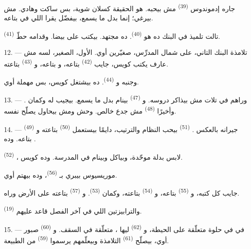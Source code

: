 جاره إدموندوس \textsuperscript{(39)} مش بيحبه. هو الحقيقة كسلان شوية، بس ساكت
وهادي. مش بيرغي؛ إنما بدل ما يسمع، بيفضّل يقرا  اللي في
 بتاعه.

تالت تلميذ في البنك ده هو  \textsuperscript{(40)}. ده مجتهد.
بيكتب على  بيضا. وقدامه حطّ 
\textsuperscript{(41)}.

12. --- تلامذة البنك التاني، على شمال المدرِّس، صغيّرين أوي. الأول،
 الصغير، لسه مش عارف يكتب كويس، جايب 
\textsuperscript{(42)} بتاعه، و بتاعه، و
\textsuperscript{(43)} بتاعته.

وجنبه  و \textsuperscript{(44)}. ده بيشتغل
كويس، بس  مهملة أوي.

13. --- وراهم في تلات  مش بيذاكر دروسه.
و \textsuperscript{(47)} بينام بدل ما يسمع.  بيجيب له
 وكمان . وأخيرًا 
\textsuperscript{(48)} مش جدع خالص.  وحش ومش بيحاول يصلّح نفسه.

14. --- جيرانه بالعكس . 
\textsuperscript{(51)} بيحب النظام والترتيب، دايمًا بيستعمل 
\textsuperscript{(50)} بتاعته و \textsuperscript{(49)} بتاعه.
وده .

 \textsuperscript{(52)} ، لابس بدلة موحّدة،
وبياكل وبينام في المدرسة. وده  كويس.

موريسيوس بيبري  بـ \textsuperscript{(56)}، وده بيهتم
أوي.

جايب كل كتبه، و \textsuperscript{(55)} بتاعه، و
\textsuperscript{(54)} بتاعته، وكمان  \textsuperscript{(53)}.
و \textsuperscript{(57)} بتاعته على الأرض وراه.

والترابيزتين اللي في آخر الفصل قاعد عليهم 
\textsuperscript{(19)}.

\VUsaut{4.6mm}
\VUsaut{3.4mm}

15. --- في  في  حلوة متعلّقة على الحيطة،
و \textsuperscript{(62)} ليها ، متعلّقة في السقف.
و \textsuperscript{(60)} صبور أوي، بيصلّح 
\textsuperscript{(61)} التلامذة وبيعلّمهم يرسموا 
\textsuperscript{(59)} من الطبيعة.

